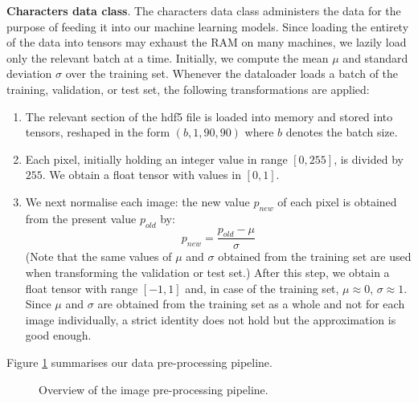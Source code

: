 \documentclass[british,12p]{article}
\begin{document}
    	
    	\textbf{Characters data class}. The characters data class administers the data for the purpose of feeding it into our machine learning models. Since loading the entirety of the data into tensors may exhaust the RAM on many machines, we lazily load only the relevant batch at a time. Initially, we compute the mean $\mu$ and standard deviation $\sigma$ over the training set. Whenever the dataloader loads a batch of the training, validation, or test set, the following transformations are applied:
    	\begin{enumerate}
    		\item The relevant section of the hdf5 file is loaded into memory and stored into tensors, reshaped in the form $(b, 1, 90, 90)$ where $b$ denotes the batch size.
    		\item Each pixel, initially holding an integer value in range $[0, 255]$, is divided by $255$. We obtain a float tensor with values in $[0, 1]$.
    		\item We next normalise each image: the new value $p_{new}$ of each pixel is obtained from the present value $p_{old}$ by: $$ p_{new} = \frac{p_{old} - \mu}{\sigma}$$ (Note that the same values of $\mu$ and $\sigma$  obtained from the training set are used when transforming the validation or test set.) After this step, we obtain a float tensor with range $[-1, 1]$ and, in case of the training set, $\mu \approx 0$, $\sigma \approx 1$. Since $\mu$ and $\sigma$ are obtained from the training set as a whole and not for each image individually, a strict identity does not hold but the approximation is good enough.
    	\end{enumerate}
    	
    	Figure \ref{fig-preprocessing} summarises our data pre-processing pipeline. 
    	
    	\begin{figure}[h!]
			\begin{center}
  				\caption{Overview of the image pre-processing pipeline.}
  				\label{fig-preprocessing}
  			\end{center}
		\end{figure}
    	
    	
\end{document}
